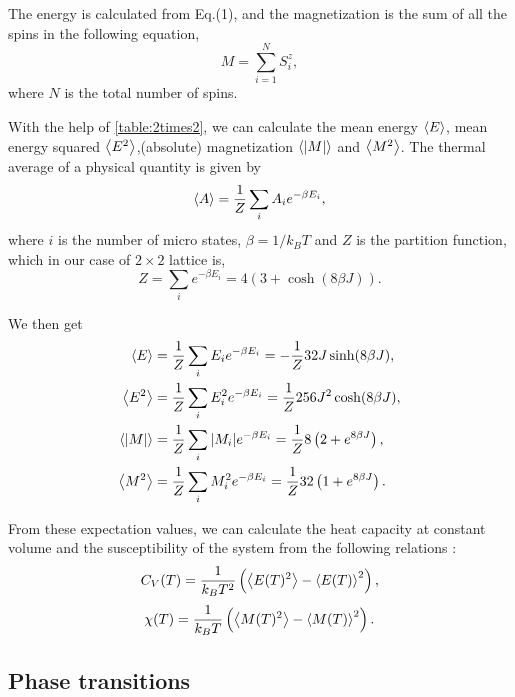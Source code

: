\documentclass{article}
\begin{document}
The energy is calculated from Eq.(1), and the magnetization is the sum of all the spins in the following equation,
\begin{equation}
M = \sum_{i = 1}^{N} S^z_i,
\end{equation}
where $N$ is the total number of spins.

With the help of \ref{table:2times2}, we can calculate the mean energy $\ev{E}$, mean energy squared $\ev{E^2}$,(absolute) magnetization $\ev{\abs{M}}$ and  $\ev{M^2}$. The thermal average of a physical quantity is given by
\begin{equation}
\ev{A} = \frac{1}{Z} \sum_i A_i e^{-\beta E_i},
\end{equation}
where $i$ is the number of micro states, $\beta = 1/k_B T$ and $Z$ is the partition function, which in our case of $2 \times 2$ lattice is,
\begin{equation}
Z = \sum_i e^{-\beta E_i} = 4\left(3 + \cosh (8\beta J)\right).
\end{equation}

We then get
\begin{align}\label{eq:expvals}
\ev{E} &= \frac{1}{Z} \sum_i E_i e^{-\beta E_i} = -\frac{1}{Z}32J\sinh (8\beta J),\\
\ev{E^2} &= \frac{1}{Z} \sum_i E_i^2 e^{-\beta E_i} = \frac{1}{Z}256J^2\cosh (8\beta J),\\
\ev{\abs{M}} &= \frac{1}{Z} \sum_i \abs{M_i} e^{-\beta E_i} = \frac{1}{Z}8\left(2 + e^{8\beta J}\right),\\
\ev{M^2} &= \frac{1}{Z} \sum_i M_i^2 e^{-\beta E_i} = \frac{1}{Z}32\left( 1 + e^{8\beta J}\right).
\end{align}

From these expectation values, we can calculate the heat capacity at constant volume and the susceptibility of the system from the following relations  \cite{hjorten}:
\begin{equation}\label{eq:heatcap}
C_V(T) = \frac{1}{k_BT^2}\left(\ev{E(T)^2} - \ev{E(T)}^2\right),
\end{equation}
\begin{equation}\label{eq:suscept}
\chi(T) = \frac{1}{k_B T}\left(\ev{M(T)^2} - \ev{M(T)}^2\right).
\end{equation}

\subsection{Phase transitions }\label{const_mot}
\end{document}
